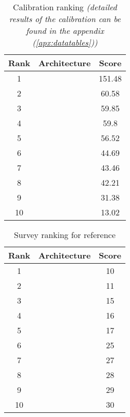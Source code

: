 \begin{table}[h]
    \label{table:calibration}
    \centering
    \begin{tabular}{ |c|c|c| }
    \hline
    Rank & Architecture & Score \\
    \hline
    1 & \nameref{fig:architecture10} & 151.48 \\
    2 & \nameref{fig:architecture3} & 60.58 \\
    3 & \nameref{fig:architecture8} & 59.85 \\
    4 & \nameref{fig:architecture6} & 59.8 \\
    5 & \nameref{fig:architecture2} & 56.52 \\
    6 & \nameref{fig:architecture5} & 44.69 \\
    7 & \nameref{fig:architecture1} & 43.46 \\
    8 & \nameref{fig:architecture4} & 42.21 \\
    9 & \nameref{fig:architecture9} & 31.38 \\
    10 & \nameref{fig:architecture7} & 13.02 \\
    \hline
    \end{tabular}
    \caption{Calibration ranking \textit{(detailed results of the calibration can be found in the appendix (\ref{apx:datatables}))}}
\end{table}

\begin{table}[h]
    \label{table:survey2}
    \centering
    \begin{tabular}{ |c|c|c| }
    \hline
    Rank & Architecture & Score \\
    \hline
    1 & \nameref{fig:architecture3} & 10 \\
    2 & \nameref{fig:architecture8} & 11 \\
    3 & \nameref{fig:architecture6} & 15 \\
    4 & \nameref{fig:architecture10} & 16 \\
    5 & \nameref{fig:architecture2} & 17 \\
    6 & \nameref{fig:architecture1} & 25 \\
    7 & \nameref{fig:architecture5} & 27 \\
    8 & \nameref{fig:architecture7} & 28 \\
    9 & \nameref{fig:architecture9} & 29 \\
    10 & \nameref{fig:architecture4} & 30\\
    \hline
    \end{tabular}
    \caption{Survey ranking for reference}
\end{table}